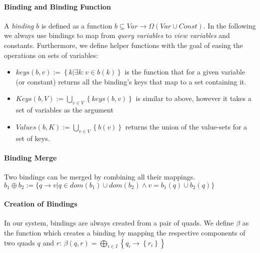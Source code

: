 \documentclass[a4paper,twoside,bibtotoc,abstracton,12pt,BCOR=15mm]{scrreprt}
\begin{document}
\paragraph{Binding and Binding Function}
A \emph{binding} $b$ is defined as a function $b \subseteq Var \rightarrow \Omega{ \left ( Var \cup Const \right ) }$.
In the following we always use bindings to map from \emph{query variables} to \emph{view variables} and constants.
Furthermore, we define helper functions with the goal of easing the operations on sets of variables:
\begin{itemize}
\item $keys(b, v) := \left\{ k | \exists k: v \in b(k) \right\}$ is the function that for a given variable (or constant) returns all the binding's keys that map to a set containing it.
\item $Keys(b, V) := \bigcup_{v \in V} \left \{ keys(b, v) \right \}$ is similar to above, however it takes a set of variables as the argument
\item $Values(b, K) := \bigcup_{v \in V} \left \{ b(v) \right \}$ returns the union of the value-sets for a set of keys.
\end{itemize}


\paragraph{Binding Merge}
Two bindings can be merged by combining all their mappings. $b_1 \oplus b_2 := \{q \rightarrow v | q \in {dom(b_1) \cup dom(b_2)} \wedge v = b_1(q) \cup b_2(q)\}$ 

\paragraph{Creation of Bindings}
In our system, bindings are always created from a pair of quads. We define $\beta$ as the function which creates a binding
by mapping the respective components of two quads $q$ and $r$:
 $\beta(q, r) = \bigoplus_{i \in I} \left \{q_i \rightarrow \left \{r_i \right \} \right \}$
\end{document}
